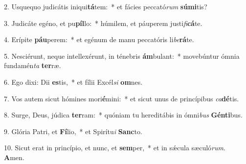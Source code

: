 2. Usquequo judicátis iniqui\textbf{tá}tem:~*  et fácies peccató\textit{rum} \textbf{sú}\textbf{mi}tis?\

3. Judicáte egéno, et pu\textbf{píl}lo:~*  húmilem, et páuperem justi\textit{fi}\textbf{cá}te.\

4. Erípite \textbf{páu}perem:~*  et egénum de manu peccatóris li\textit{be}\textbf{rá}te.\

5. Nesciérunt, neque intellexérunt, in ténebris \textbf{ám}bulant:~*  movebúntur ómnia fundamén\textit{ta} \textbf{ter}ræ.\

6. Ego dixi: Dii \textbf{es}tis,~*  et fílii Excél\textit{si} \textbf{om}nes.\

7. Vos autem sicut hómines mori\textbf{é}mini:~*  et sicut unus de princípibus \textit{ca}\textbf{dé}tis.\

8. Surge, Deus, júdica \textbf{ter}ram:~*  quóniam tu hereditábis in ómni\textit{bus} \textbf{Gén}\textbf{ti}bus.\

9. Glória Patri, et \textbf{Fí}lio,~*  et Spirítu\textit{i} \textbf{Sanc}to.\

10. Sicut erat in princípio, et nunc, et \textbf{sem}per,~*  et in sǽcula sæculó\textit{rum}. \textbf{A}men.\

